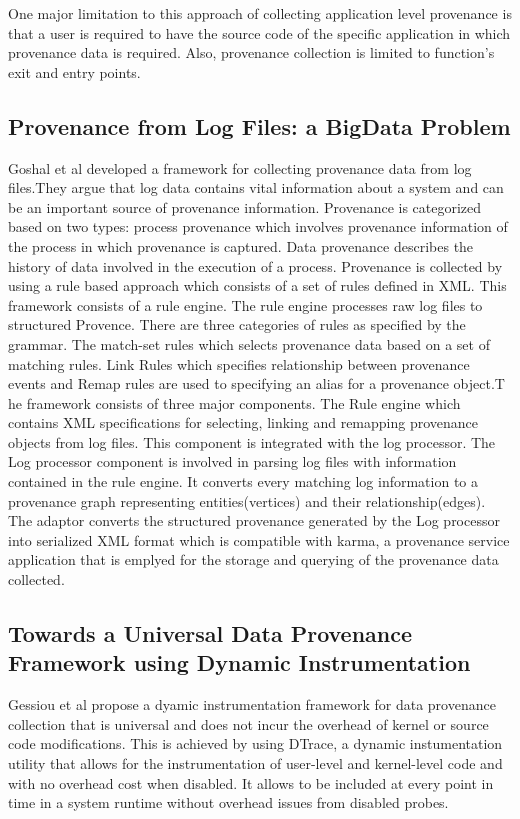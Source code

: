 One major limitation to this approach of collecting application level provenance is that a user is required to have the source code of the specific application in which provenance data is required. Also, provenance collection is limited to function's exit and entry points.


\subsection{Provenance from Log Files: a BigData Problem}


Goshal et al developed a framework for collecting provenance data from log files.They argue that log data contains vital information about a system and can be an important source of provenance information. Provenance is categorized based on two types: process provenance which involves provenance information of the process in which provenance is captured. Data provenance describes the history of data involved in the execution of a process. Provenance is collected by using a rule based approach which consists of a set of rules defined in XML. This framework consists of a rule engine. The rule engine processes raw log files to structured Provence. There are three categories of rules as specified by the grammar. The match-set rules which selects provenance data based on a set of matching rules. Link Rules which specifies relationship between provenance events and Remap rules are used to specifying an alias for a provenance object.T he framework consists of three major components. The Rule engine which contains XML specifications for selecting, linking and remapping provenance objects from log files. This component is integrated with the log processor. The Log processor component is involved in parsing log files with information contained in the rule engine. It converts every matching log information to a provenance graph representing entities(vertices) and their relationship(edges). The adaptor converts the structured provenance generated by the Log processor into serialized XML format which is compatible with karma, a provenance service application that is emplyed for the storage and querying of the provenance data collected.




\subsection{Towards a Universal Data Provenance Framework using Dynamic Instrumentation}
Gessiou et al propose a dyamic instrumentation framework for data provenance collection that is universal and does not incur the overhead of kernel or source code modifications. This is achieved by using DTrace, a dynamic instumentation utility that allows for the instrumentation of user-level and kernel-level code and with no overhead cost when disabled. It allows to be included at every point in time in a system  runtime without overhead issues from disabled probes.

